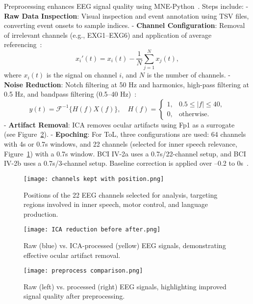 \documentclass[pdflatex,sn-mathphys-num]{sn-jnl}%
\theoremstyle{thmstyleone}
\theoremstyle{thmstyletwo}
\theoremstyle{thmstylethree}
\begin{document}
Preprocessing enhances EEG signal quality using MNE-Python~\cite{Gramfort2013}. Steps include:
- \textbf{Raw Data Inspection}: Visual inspection and event annotation using TSV files, converting event onsets to sample indices.
- \textbf{Channel Configuration}: Removal of irrelevant channels (e.g., EXG1–EXG6) and application of average referencing~\cite{Ferree2006}:
  \[
  x_i'(t) = x_i(t) - \frac{1}{N}\sum_{j=1}^{N}x_j(t),
  \]
  where \(x_i(t)\) is the signal on channel \(i\), and \(N\) is the number of channels.
- \textbf{Noise Reduction}: Notch filtering at 50 Hz and harmonics, high-pass filtering at 0.5 Hz, and bandpass filtering (0.5–40 Hz)~\cite{Widmann2015}:
  \[
  y(t) = \mathcal{F}^{-1}\{H(f)X(f)\}, \quad H(f) = \begin{cases} 1, & 0.5 \le |f| \le 40, \\ 0, & \text{otherwise.} \end{cases}
  \]
- \textbf{Artifact Removal}: ICA removes ocular artifacts using Fp1 as a surrogate~\cite{Jung2000, Delorme2004} (see Figure~\ref{fig:ICA reduction before after}).
- \textbf{Epoching}: For ToL, three configurations are used: 64 channels with 4s or 0.7s windows, and 22 channels (selected for inner speech relevance, Figure~\ref{fig:channels kept with position}) with a 0.7s window. BCI IV-2a uses a 0.7s/22-channel setup, and BCI IV-2b uses a 0.7s/3-channel setup. Baseline correction is applied over –0.2 to 0s~\cite{Kappenman2021}.

\begin{figure}[H]
    \centering
    \texttt{[image: channels kept with position.png]}
    \caption{Positions of the 22 EEG channels selected for analysis, targeting regions involved in inner speech, motor control, and language production.}
    \label{fig:channels kept with position}
\end{figure}

\begin{figure}[H]
    \centering
    \texttt{[image: ICA reduction before after.png]}
    \caption{Raw (blue) vs. ICA-processed (yellow) EEG signals, demonstrating effective ocular artifact removal.}
    \label{fig:ICA reduction before after}
\end{figure}

\begin{figure}[H]
    \centering
    \texttt{[image: preprocess comparison.png]}
    \caption{Raw (left) vs. processed (right) EEG signals, highlighting improved signal quality after preprocessing.}
    \label{fig:preprocess comparison}
\end{figure}
\end{document}
